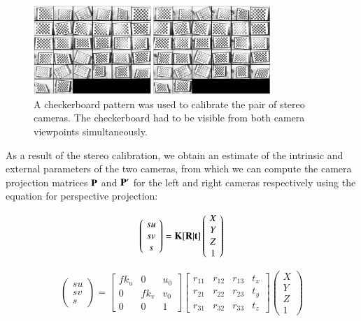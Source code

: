 \begin{figure}[htbp!]
\centering
\includegraphics[width=0.8\textwidth]{img/calib2}
	\caption{A checkerboard pattern was used to calibrate the pair of stereo cameras. The checkerboard had to be visible from both camera viewpoints simultaneously.}
	\label{fig:checkerboard}
\end{figure}

As a result of the stereo calibration, we obtain an estimate of the intrinsic and external parameters of the two cameras, from which we can compute the camera projection matrices $\mathbf{P}$ and $\mathbf{P}'$ for the left and right cameras respectively using the equation for perspective projection:

\begin{equation*}
\label{qrdecomp}
	\left(\!
    \begin{array}{c}
      su \\
      sv \\
      s
    \end{array}
  	\!\right) =
  \mathbf{K}[\mathbf{R}|\mathbf{t}]
    \left(\!
    \begin{array}{c}
      X \\
      Y \\
      Z \\
      1
    \end{array}
    \!\right) 		 
\end{equation*}

\begin{equation*}
\left(\!
    \begin{array}{c}
      su \\
      sv \\
      s
    \end{array}
  	\!\right) =
  \begin{bmatrix}
       fk_u & 0 & u_0 \\[0.3em]
       0 & fk_v & v_0 \\[0.3em]
       0 & 0 & 1
  \end{bmatrix}
    \begin{bmatrix}
       r_{11} & r_{12} & r_{13} & t_x \\[0.3em]
       r_{21} & r_{22} & r_{23} & t_y \\[0.3em]
       r_{31} & r_{32} & r_{33} & t_z
  \end{bmatrix}
    \left(\!
    \begin{array}{c}
      X \\
      Y \\
      Z \\
      1
    \end{array}
    \!\right)
\end{equation*}


